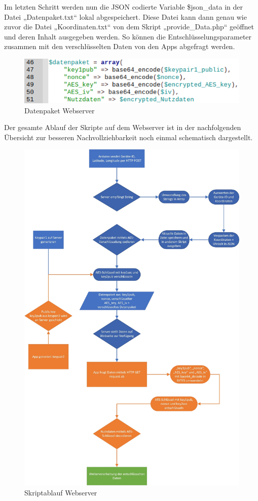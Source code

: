 Im letzten Schritt werden nun die JSON codierte Variable \$json\_data in der Datei „Datenpaket.txt“ lokal abgespeichert. Diese Datei kann dann genau wie zuvor die Datei „Koordinaten.txt“ von dem Skript „provide\_Data.php“ geöffnet und deren Inhalt ausgegeben werden. So können die Entschlüsselungsparameter zusammen mit den verschlüsselten Daten von den Apps abgefragt werden.
\begin{figure} [H]
	\begin{center}
		\includegraphics[width=1\textwidth]{Bilder/Webserver_verschluesslung.png}
		\caption{Datenpaket Webserver}
		\label{server-dp}
	\end{center}
\end{figure}
Der gesamte Ablauf der Skripte auf dem Webserver ist in der nachfolgenden Übersicht zur besseren Nachvollziehbarkeit noch einmal schematisch dargestellt.
\begin{figure} [H]
	\begin{center}
		\includegraphics[width=1\textwidth]{Bilder/Webserver_pap2.jpg}
		\caption{Skriptablauf Webserver}
		\label{server-script}
	\end{center}
\end{figure}

